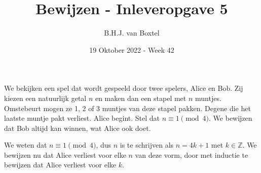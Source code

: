 \documentclass[12pt, dutch, a4paper]{article}
\theoremstyle{definition}
\begin{document}
\title{Bewijzen - Inleveropgave 5}
\author{B.H.J. van Boxtel}
\date{19 Oktober 2022 - Week 42} 

\maketitle
{} 

We bekijken een spel dat wordt gespeeld door twee spelers, Alice en Bob. 
Zij kiezen een natuurlijk getal $n$ en maken dan een stapel met $n$ muntjes. 
Omstebeurt mogen ze 1, 2 of 3 muntjes van deze stapel pakken. 
Degene die het laatste muntje pakt verliest. Alice begint. 
Stel dat $n \equiv 1 \pmod{4}$. We bewijzen dat Bob altijd kan winnen, wat Alice ook doet.

We weten dat $n \equiv 1 \pmod{4}$, 
dus $n$ is te schrijven als $n = 4k + 1$ met $k \in \mathbb{Z}$.
We bewijzen nu dat Alice verliest voor elke $n$ van deze vorm,
door met inductie te bewijzen dat Alice verliest voor elke $k$.  
\end{document}
